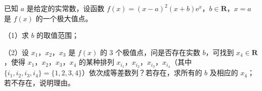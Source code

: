 \endgroup
\begin{question}
已知 $a$ 是给定的实常数，设函数 $f(x)=(x-a)^2(x+b)\mathrm e^x$，$b\in\mathbf R$，$x=a$ 是 $f(x)$ 的一个极大值点。

（1）求 $b$ 的取值范围；

（2）设 $x_1$，$x_2$，$x_3$ 是 $f(x)$ 的 $3$ 个极值点，问是否存在实数 $b$，可找到 $x_4\in\mathbf R$，使得 $x_1$，$x_2$，$x_3$，$x_4$ 的某种排列 $x_{i_1}$，$x_{i_2}$，$x_{i_3}$，$x_{i_4}$（其中 $\{i_1,i_2,i_3,i_4\}=\{1,2,3,4\}$）依次成等差数列？若存在，求所有的 $b$ 及相应的 $x_4$；若不存在，说明理由。

\end{question}